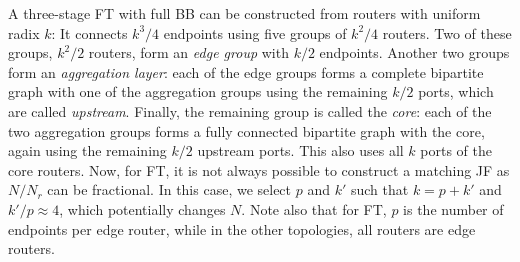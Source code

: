 \noindent
{}
%
A three-stage FT with full BB can be constructed from routers with uniform
radix $k$: It connects ${k^3}/4$ endpoints using five groups of ${k^2}/4$
routers. Two of these groups, ${k^2}/2$ routers, form an \emph{edge group}
with ${k}/2$ endpoints.  Another two groups form an \emph{aggregation layer}:
each of the edge groups forms a complete bipartite graph with one of the
aggregation groups using the remaining ${k}/2$ ports, which are called
\emph{upstream}. Finally, the remaining group is called the \emph{core}: each
of the two aggregation groups forms a fully connected bipartite graph with the
core, again using the remaining ${k}/2$ upstream ports. This also uses all $k$
ports of the core routers.
%
Now, for FT, it is not always possible to construct a matching JF as $N/N_r$
can be fractional. In this case, we select $p$ and $k'$ such that $k = p+k'$
and ${k'}/p \approx 4$, which potentially changes $N$. Note also that for FT,
$p$ is the number of endpoints per edge router, while in the other topologies,
all routers are edge routers.


